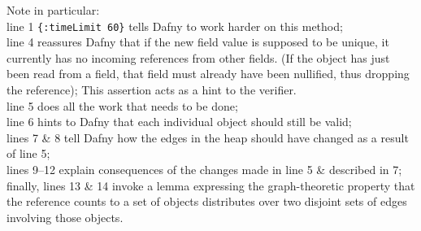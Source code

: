 \noindent Note in particular:\\
\noindent line 1 \lstinline+{:timeLimit 60}+ tells Dafny to work harder on this method;\\
\noindent line 4 reassures Dafny that if the new field value is supposed to be unique,   it currently has no incoming references from other fields.
(If the object has just been read from a field, that field must already have been nullified, thus dropping the reference);
This assertion acts as a hint to the verifier.\\
\noindent line 5 does all the work that needs to be done;\\
\noindent line 6 hints to Dafny that each individual object should still be valid;\\
\noindent lines 7 \& 8  tell Dafny how the edges in the heap should have changed as a result of line 5;\\
\noindent lines 9--12 explain consequences of the changes made in line 5 \& described in 7;\\
\noindent finally, lines 13 \& 14  invoke a lemma expressing the graph-theoretic property that the reference counts to a set of objects 
distributes over two disjoint sets of edges involving those objects.











